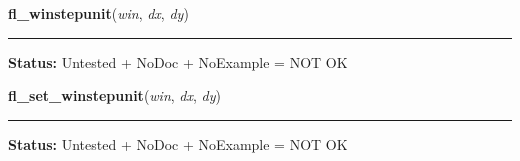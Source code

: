     \label{xformslib:library:fl_winstepsize}

    \vspace{0.5ex}

\hspace{.8\funcindent}\begin{boxedminipage}{\funcwidth}

    \raggedright \textbf{fl\_winstepunit}(\textit{win}, \textit{dx}, \textit{dy})

    \vspace{-1.5ex}

    \rule{\textwidth}{0.5\fboxrule}
\setlength{\parskip}{2ex}
\setlength{\parskip}{1ex}
\textbf{Status:} Untested + NoDoc + NoExample = NOT OK



    \end{boxedminipage}

    \label{xformslib:library:fl_winstepsize}

    \vspace{0.5ex}

\hspace{.8\funcindent}\begin{boxedminipage}{\funcwidth}

    \raggedright \textbf{fl\_set\_winstepunit}(\textit{win}, \textit{dx}, \textit{dy})

    \vspace{-1.5ex}

    \rule{\textwidth}{0.5\fboxrule}
\setlength{\parskip}{2ex}
\setlength{\parskip}{1ex}
\textbf{Status:} Untested + NoDoc + NoExample = NOT OK



    \end{boxedminipage}

    \label{xformslib:library:fl_winisvalid}

    \vspace{0.5ex}

